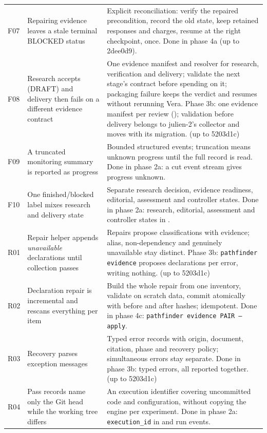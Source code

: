 \documentclass[11pt,a4paper]{article}
\begin{document}
{\begin{xltabular}{\linewidth}{L{8mm}L{52mm}Y}
F07 & Repairing evidence leaves a stale terminal BLOCKED status & Explicit reconciliation: verify the repaired precondition, record the old state, keep retained responses and charges, resume at the right checkpoint, once. Done in phase 4a (up to 2dee0d9).\\
F08 & Research accepts (DRAFT) and delivery then fails on a different evidence contract & One evidence manifest and resolver for research, verification and delivery; validate the next stage's contract before spending on it; packaging failure keeps the verdict and resumes without rerunning Vera. Phase 3b: one evidence manifest per review (); validation before delivery belongs to julien-2's collector and moves with its migration. (up to 5203d1c)\\
F09 & A truncated monitoring summary is reported as progress & Bounded structured events; truncation means unknown progress until the full record is read. Done in phase 2a: a cut event stream gives progress unknown.\\
F10 & One finished/blocked label mixes research and delivery state & Separate research decision, evidence readiness, editorial, assessment and controller states. Done in phase 2a: research, editorial, assessment and controller states in .\\
R01 & Repair helper appends \emph{unavailable} declarations until collection passes & Repairs propose classifications with evidence; alias, non-dependency and genuinely unavailable stay distinct. Phase 3b: \texttt{pathfinder evidence} proposes declarations per error, writing nothing. (up to 5203d1c)\\
R02 & Declaration repair is incremental and rescans everything per item & Build the whole repair from one inventory, validate on scratch data, commit atomically with before and after hashes; idempotent. Done in phase 4c: \texttt{pathfinder evidence PAIR --apply}.\\
R03 & Recovery parses exception messages & Typed error records with origin, document, citation, phase and recovery policy; simultaneous errors stay separate. Done in phase 3b: typed errors, all reported together. (up to 5203d1c)\\
R04 & Pass records name only the Git head while the working tree differs & An execution identifier covering uncommitted code and configuration, without copying the engine per experiment. Done in phase 2a: \texttt{execution\_id} in  and run events.\\
\end{xltabular}}
\end{document}
